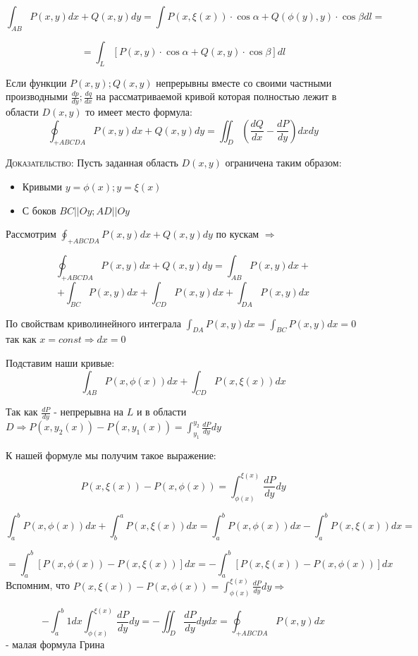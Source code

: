 $$
\int_{AB} P(x,y) dx + Q(x,y) dy = \int P(x, \xi(x)) \cdot \cos \alpha + Q(\phi(y), y) \cdot \cos \beta dl = 
$$

$$
= \int_L [P(x,y) \cdot \cos \alpha + Q(x,y) \cdot \cos \beta] dl
$$

\begin{definition}
    Если функции $P(x,y); Q(x,y)$ непрерывны вместе со своими частными производными $\frac{dp}{dy}; \frac{dq}{dx}$ на рассматриваемой кривой которая полностью лежит в области $D(x,y)$ то имеет место формула: 
    $$
    \oint_{+ABCDA} P(x,y)dx + Q(x,y) dy = \iint_D (\frac{dQ}{dx} - \frac{dP}{dy})dxdy
    $$

    \textsc{Доказательство:}
    Пусть заданная область $D(x,y)$ ограничена таким образом: 
    \begin{itemize}
        \item Кривыми $y=\phi(x); y=\xi(x)$
        \item С боков $BC || Oy; AD || Oy$
    \end{itemize}
    Рассмотрим $\oint_{+ABCDA} P(x,y) dx + Q(x,y)dy$ по кускам $\Rightarrow $

    $$
    \oint_{+ABCDA} P(x,y) dx + Q(x,y)dy = \int_{AB} P(x,y)dx + $$ $$ +  \int_{BC} P(x,y)dx + \int_{CD} P(x,y)dx + \int_{DA} P(x,y)dx 
    $$

    По свойствам криволинейного интеграла $\int_{DA} P(x,y) dx = \int_{BC} P(x,y) dx = 0$ так как $x = const \Rightarrow dx = 0$

    Подставим наши кривые:
    $$
    \int_{AB} P(x, \phi(x)) dx + \int_{CD} P(x, \xi(x)) dx 
    $$

    Так как $\frac{dP}{dy} $ - непрерывна на $L$ и в области $D \Rightarrow P(x, y_2(x)) - P(x,y_1(x) ) = \int_{y_1}^{y_2} \frac{dP}{dy} dy$ 

    К нашей формуле мы получим такое выражение:

    $$
        P(x,\xi(x)) - P(x,\phi(x)) = \int_{\phi(x)}^{\xi(x)} \frac{dP}{dy} dy 
    $$

    $$
        \int_a^b P(x,\phi(x)) dx + \int^a_b P(x,\xi(x)) dx  = \int^b_a P(x,\phi(x)) dx - \int_a^b P(x,\xi(x)) dx = 
    $$

    $$
     = \int_a^b [P(x,\phi(x)) - P(x, \xi (x))] dx = - \int_a^b [P(x,\xi(x) ) - P(x, \phi(x))] dx 
    $$
    Вспомним, что $P(x, \xi(x)) - P(x, \phi(x)) = \int_{\phi(x)}^{\xi(x)} \frac{dP}{dy} dy \Rightarrow$

    $$
        -\int_a^b 1dx \int_{\phi(x)}^{\xi(x)} \frac{dP}{dy} dy = - \iint_D \frac{dP}{dy} dydx = \oint_{+ABCDA} P(x,y) dx
    $$ - малая формула Грина 


\end{definition}
